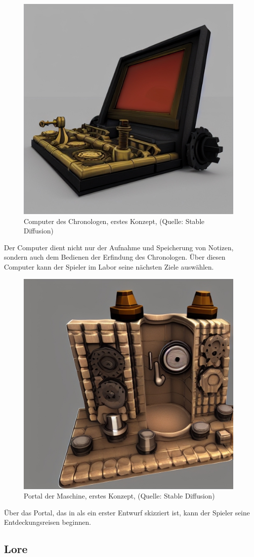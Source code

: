 \begin{figure}[ht]
\centering
\includegraphics[width=0.6\linewidth]{content/pictures/bsp_computer_03.jpg}
\caption{Computer des Chronologen, erstes Konzept, (Quelle: Stable Diffusion)}
\label{fig:bsp_computer_03}
\end{figure}
Der Computer dient nicht nur der Aufnahme und Speicherung von Notizen, sondern auch dem Bedienen der Erfindung des Chronologen. Über diesen Computer kann der Spieler im Labor seine nächsten Ziele auswählen.

\begin{figure}[ht]
\centering
\includegraphics[width=0.6\linewidth]{content/pictures/portal_01.jpg}
\caption{Portal der Maschine, erstes Konzept, (Quelle: Stable Diffusion)}
\label{fig:portal_01}
\end{figure}
Über das Portal, das in  als ein erster Entwurf skizziert ist, kann der Spieler seine Entdeckungsreisen beginnen.

\newpage
\subsection{Lore}

